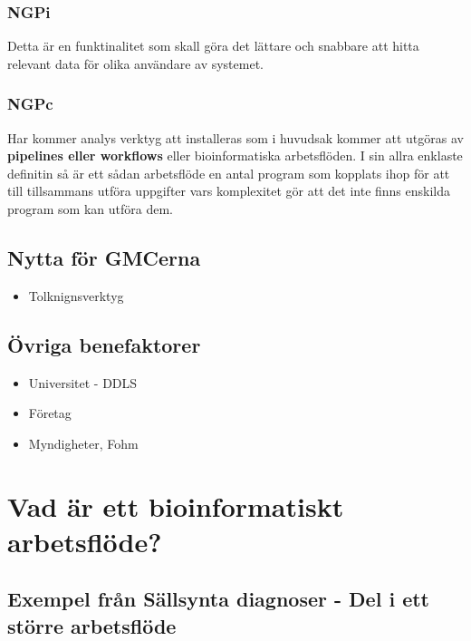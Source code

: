 \documentclass[
  letterpaper,
  DIV=11,
  numbers=noendperiod]{scrreprt}
\providecommand{\tightlist}{%
  \setlength{\itemsep}{0pt}\setlength{\parskip}{0pt}}\usepackage{longtable,booktabs,array}
\begin{document}
\subsection{NGPi}\label{ngpi}

Detta är en funktinalitet som skall göra det lättare och snabbare att
hitta relevant data för olika användare av systemet.

\subsection{NGPc}\label{ngpc}

Har kommer analys verktyg att installeras som i huvudsak kommer att
utgöras av \textbf{pipelines eller workflows} eller bioinformatiska
arbetsflöden. I sin allra enklaste definitin så är ett sådan arbetsflöde
en antal program som kopplats ihop för att till tillsammans utföra
uppgifter vars komplexitet gör att det inte finns enskilda program som
kan utföra dem.

\section{Nytta för GMCerna}\label{nytta-fuxf6r-gmcerna}

\begin{itemize}
\tightlist
\item
  Tolknignsverktyg
\end{itemize}

\section{Övriga benefaktorer}\label{uxf6vriga-benefaktorer}

\begin{itemize}
\tightlist
\item
  Universitet - DDLS
\item
  Företag
\item
  Myndigheter, Fohm
\end{itemize}


\chapter{Vad är ett bioinformatiskt
arbetsflöde?}\label{vad-uxe4r-ett-bioinformatiskt-arbetsfluxf6de}

\section{Exempel från Sällsynta diagnoser - Del i ett större
arbetsflöde}\label{exempel-fruxe5n-suxe4llsynta-diagnoser---del-i-ett-stuxf6rre-arbetsfluxf6de}
\end{document}
